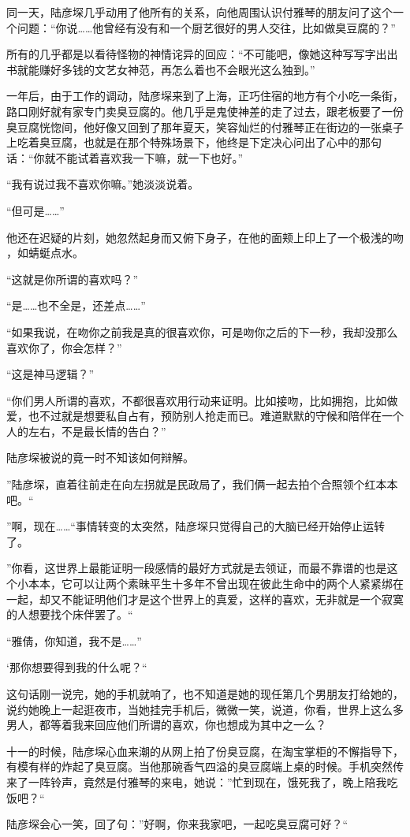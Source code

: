 \documentclass[11pt,a4paper]{article}
\begin{document}
同一天，陆彦堔几乎动用了他所有的关系，向他周围认识付雅琴的朋友问了这个一个问题：“你说……他曾经有没有和一个厨艺很好的男人交往，比如做臭豆腐的？”﻿﻿

所有的几乎都是以看待怪物的神情诧异的回应：“不可能吧，像她这种写写字出出书就能赚好多钱的文艺女神范，再怎么着也不会眼光这么独到。”﻿﻿﻿

一年后，由于工作的调动，陆彦堔来到了上海，正巧住宿的地方有个小吃一条街，路口刚好就有家专门卖臭豆腐的。他几乎是鬼使神差的走了过去，跟老板要了一份臭豆腐恍惚间，他好像又回到了那年夏天，笑容灿烂的付雅琴正在街边的一张桌子上吃着臭豆腐，也就是在那个特殊场景下，他终是下定决心问出了心中的那句话：“你就不能试着喜欢我一下嘛，就一下也好。”﻿﻿

“我有说过我不喜欢你嘛。”她淡淡说着。﻿﻿

“但可是……”﻿﻿

他还在迟疑的片刻，她忽然起身而又俯下身子，在他的面颊上印上了一个极浅的吻 ，如蜻蜓点水。﻿﻿

“这就是你所谓的喜欢吗？”﻿﻿

“是……也不全是，还差点……”﻿﻿

“如果我说，在吻你之前我是真的很喜欢你，可是吻你之后的下一秒，我却没那么喜欢你了，你会怎样？”﻿﻿

“这是神马逻辑？”﻿﻿

“你们男人所谓的喜欢，不都很喜欢用行动来证明。比如接吻，比如拥抱，比如做爱，也不过就是想要私自占有，预防别人抢走而已。难道默默的守候和陪伴在一个人的左右，不是最长情的告白？”﻿﻿

陆彦堔被说的竟一时不知该如何辩解。﻿﻿

”陆彦堔，直着往前走在向左拐就是民政局了，我们俩一起去拍个合照领个红本本吧。“﻿﻿

”啊，现在……“事情转变的太突然，陆彦堔只觉得自己的大脑已经开始停止运转了。﻿﻿

”你看，这世界上最能证明一段感情的最好方式就是去领证，而最不靠谱的也是这个小本本，它可以让两个素昧平生十多年不曾出现在彼此生命中的两个人紧紧绑在一起，却又不能证明他们才是这个世界上的真爱，这样的喜欢，无非就是一个寂寞的人想要找个床伴罢了。“﻿﻿

“雅倩，你知道，我不是……”﻿﻿

‘那你想要得到我的什么呢？“﻿﻿

这句话刚一说完，她的手机就响了，也不知道是她的现任第几个男朋友打给她的，说约她晚上一起逛夜市，当她挂完手机后，微微一笑，说道，你看，世界上这么多男人，都等着我来回应他们所谓的喜欢，你也想成为其中之一么？﻿﻿

十一的时候，陆彦堔心血来潮的从网上拍了份臭豆腐，在淘宝掌柜的不懈指导下，有模有样的炸起了臭豆腐。当他那碗香气四溢的臭豆腐端上桌的时候。手机突然传来了一阵铃声，竟然是付雅琴的来电，她说：”忙到现在，饿死我了，晚上陪我吃饭吧？“﻿﻿

陆彦堔会心一笑，回了句：”好啊，你来我家吧，一起吃臭豆腐可好？“﻿
\end{document}
